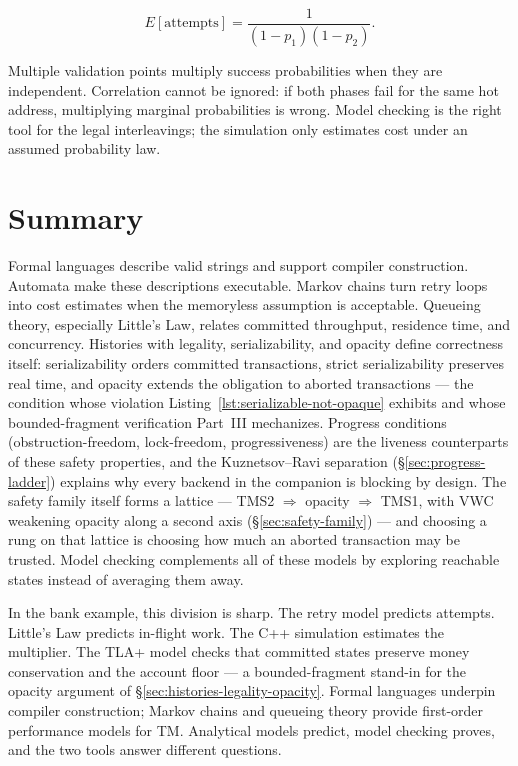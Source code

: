 $$
E[\mathrm{attempts}] =
\frac{1}{(1-p_1)(1-p_2)}.
$$

Multiple validation points multiply success probabilities when they are independent. Correlation cannot be ignored: if both phases fail for the same hot address, multiplying marginal probabilities is wrong. Model checking is the right tool for the legal interleavings; the simulation only estimates cost under an assumed probability law.

\section{Summary}

Formal languages describe valid strings and support compiler construction. Automata make these descriptions executable. Markov chains turn retry loops into cost estimates when the memoryless assumption is acceptable. Queueing theory, especially Little's Law, relates committed throughput, residence time, and concurrency. Histories with legality, serializability, and opacity define correctness itself: serializability orders committed transactions, strict serializability preserves real time, and opacity extends the obligation to aborted transactions --- the condition whose violation Listing~\ref{lst:serializable-not-opaque} exhibits and whose bounded-fragment verification Part~III mechanizes. Progress conditions (obstruction-freedom, lock-freedom, progressiveness) are the liveness counterparts of these safety properties, and the Kuznetsov--Ravi separation (\S\ref{sec:progress-ladder}) explains why every backend in the companion is blocking by design. The safety family itself forms a lattice --- TMS2 $\Rightarrow$ opacity $\Rightarrow$ TMS1, with VWC weakening opacity along a second axis (\S\ref{sec:safety-family}) --- and choosing a rung on that lattice is choosing how much an aborted transaction may be trusted. Model checking complements all of these models by exploring reachable states instead of averaging them away.

In the bank example, this division is sharp. The retry model predicts attempts. Little's Law predicts in-flight work. The C++ simulation estimates the multiplier. The TLA+ model checks that committed states preserve money conservation and the account floor --- a bounded-fragment stand-in for the opacity argument of \S\ref{sec:histories-legality-opacity}. Formal languages underpin compiler construction; Markov chains and queueing theory provide first-order performance models for TM. Analytical models predict, model checking proves, and the two tools answer different questions.

